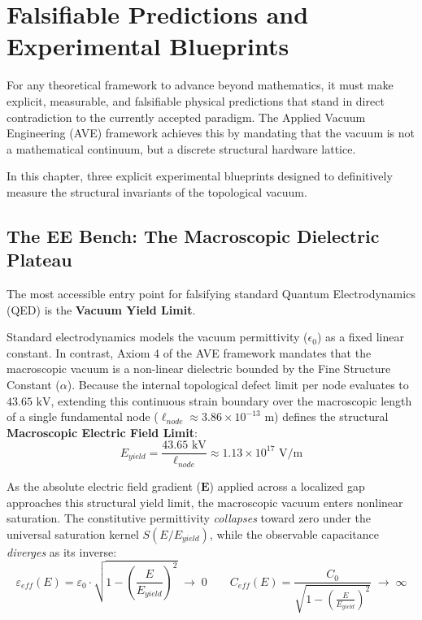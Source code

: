 \chapter{Falsifiable Predictions and Experimental Blueprints}
\label{ch:falsifiable_predictions}

For any theoretical framework to advance beyond mathematics, it must make explicit, measurable, and falsifiable physical predictions that stand in direct contradiction to the currently accepted paradigm. The Applied Vacuum Engineering (AVE) framework achieves this by mandating that the vacuum is not a mathematical continuum, but a discrete structural hardware lattice.

In this chapter, three explicit experimental blueprints designed to definitively measure the structural invariants of the topological vacuum.

\section{The EE Bench: The Macroscopic Dielectric Plateau}
The most accessible entry point for falsifying standard Quantum Electrodynamics (QED) is the \textbf{Vacuum Yield Limit}.

Standard electrodynamics models the vacuum permittivity ($\epsilon_0$) as a fixed linear constant. In contrast, Axiom 4 of the AVE framework mandates that the macroscopic vacuum is a non-linear dielectric bounded by the Fine Structure Constant ($\alpha$). Because the internal topological defect limit per node evaluates to $43.65 \text{ kV}$, extending this continuous strain boundary over the macroscopic length of a single fundamental node ($\ell_{node} \approx 3.86 \times 10^{-13} \text{ m}$) defines the structural \textbf{Macroscopic Electric Field Limit}:
\begin{equation}
    E_{yield} = \frac{43.65 \text{ kV}}{\ell_{node}} \approx 1.13 \times 10^{17} \text{ V/m}
\end{equation}

As the absolute electric field gradient ($\mathbf{E}$) applied across a localized gap approaches this structural yield limit, the macroscopic vacuum enters nonlinear saturation. The constitutive permittivity \emph{collapses} toward zero under the universal saturation kernel $S(E/E_{yield})$, while the observable capacitance \emph{diverges} as its inverse:
\begin{equation}
    \varepsilon_{eff}(E) = \varepsilon_0 \cdot \sqrt{1 - \left(\frac{E}{E_{yield}}\right)^2} \;\to\; 0
    \qquad
    C_{eff}(E) = \frac{C_0}{\sqrt{1 - \left(\frac{E}{E_{yield}}\right)^2}} \;\to\; \infty
\end{equation}

